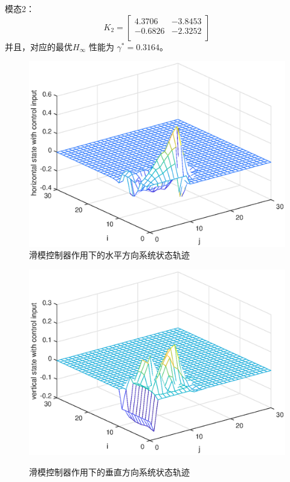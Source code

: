 	模态2：
	\begin{equation*}
	K_{2} = 	\begin{bmatrix}
	4.3706  & -3.8453 \\
	-0.6826 &  -2.3252 \\
	\end{bmatrix}
	\end{equation*}
	并且，对应的最优$H_{\infty}$ 性能为 $\gamma^{*}=0.3164$。
	\begin{figure}[!htb]
		\centering\includegraphics[scale=0.6]{./figures/2dsmc/simulations/h-state-with-force.eps}
		\caption{滑模控制器作用下的水平方向系统状态轨迹}
		\label{fig5}
	\end{figure}
	\begin{figure}[!htb]
		\centering\includegraphics[scale=0.6]{./figures/2dsmc/simulations/v-state-with-force_eps.eps}\\ 
		\caption{滑模控制器作用下的垂直方向系统状态轨迹}
		\label{fig6}
	\end{figure}
